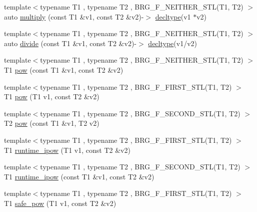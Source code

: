 \begin{DoxyCompactItemize}
\item 
{\footnotesize template$<$typename T1 , typename T2 , B\-R\-G\-\_\-\-F\-\_\-\-N\-E\-I\-T\-H\-E\-R\-\_\-\-S\-T\-L(\-T1, T2) $>$ }\\auto \hyperlink{namespaceIceBRG_a8e630a2f094b4528023edf931286468f}{multiply} (const T1 \&v1, const T2 \&v2)-\/$>$ \hyperlink{namespaceIceBRG_a528e5024ecab03049320529180ae84a8}{decltype}(v1 $\ast$v2)
\item 
{\footnotesize template$<$typename T1 , typename T2 , B\-R\-G\-\_\-\-F\-\_\-\-N\-E\-I\-T\-H\-E\-R\-\_\-\-S\-T\-L(\-T1, T2) $>$ }\\auto \hyperlink{namespaceIceBRG_ab51e399dcfa9da59097195c55e1b6254}{divide} (const T1 \&v1, const T2 \&v2)-\/$>$ \hyperlink{namespaceIceBRG_a528e5024ecab03049320529180ae84a8}{decltype}(v1/v2)
\item 
{\footnotesize template$<$typename T1 , typename T2 , B\-R\-G\-\_\-\-F\-\_\-\-N\-E\-I\-T\-H\-E\-R\-\_\-\-S\-T\-L(\-T1, T2) $>$ }\\T1 \hyperlink{namespaceIceBRG_a608b4383d87426c6c580589479142d6f}{pow} (const T1 \&v1, const T2 \&v2)
\item 
{\footnotesize template$<$typename T1 , typename T2 , B\-R\-G\-\_\-\-F\-\_\-\-F\-I\-R\-S\-T\-\_\-\-S\-T\-L(\-T1, T2) $>$ }\\T1 \hyperlink{namespaceIceBRG_abfc85e29061e58044f32d7164394ab1c}{pow} (T1 v1, const T2 \&v2)
\item 
{\footnotesize template$<$typename T1 , typename T2 , B\-R\-G\-\_\-\-F\-\_\-\-S\-E\-C\-O\-N\-D\-\_\-\-S\-T\-L(\-T1, T2) $>$ }\\T2 \hyperlink{namespaceIceBRG_aa42fcad652ea8f5eb852b980db53703e}{pow} (const T1 \&v1, T2 v2)
\item 
{\footnotesize template$<$typename T1 , typename T2 , B\-R\-G\-\_\-\-F\-\_\-\-F\-I\-R\-S\-T\-\_\-\-S\-T\-L(\-T1, T2) $>$ }\\T1 \hyperlink{namespaceIceBRG_a103f2beeb1b3437601f364189bfe96c5}{runtime\-\_\-ipow} (T1 v1, const T2 \&v2)
\item 
{\footnotesize template$<$typename T1 , typename T2 , B\-R\-G\-\_\-\-F\-\_\-\-S\-E\-C\-O\-N\-D\-\_\-\-S\-T\-L(\-T1, T2) $>$ }\\T1 \hyperlink{namespaceIceBRG_a35bc45172b1ae3aa1a1eb3bdc38c66ed}{runtime\-\_\-ipow} (const T1 \&v1, const T2 \&v2)
\item 
{\footnotesize template$<$typename T1 , typename T2 , B\-R\-G\-\_\-\-F\-\_\-\-F\-I\-R\-S\-T\-\_\-\-S\-T\-L(\-T1, T2) $>$ }\\T1 \hyperlink{namespaceIceBRG_a78af4ecc72d253d05473d3d7c2de59d1}{safe\-\_\-pow} (T1 v1, const T2 \&v2)

\end{DoxyCompactItemize}
